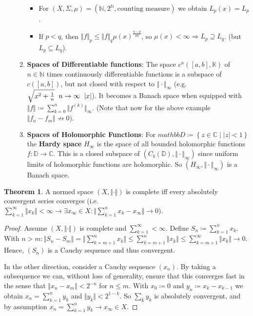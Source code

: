 \documentclass[10pt,a4paper]{article}
\theoremstyle{definition}
\theoremstyle{cor}
\theoremstyle{theorem}
\newtheorem{theorem}{Theorem}
\theoremstyle{lemma}
\theoremstyle{example}
\theoremstyle{remark}
\newcommand{\norm}[1]{\Vert #1 \Vert}
\begin{document}
\begin{itemize}
\begin{enumerate}[(1)]
\begin{itemize}
\item  For $(X, \Sigma, \mu) = \left(\mathbb{N}, 2^{\mathbb{N}}, \text{counting measure} \right)$ we obtain $L_p(x) = L_p$.
\item If $p<q$, then $\norm{f}_p \leq \norm{f}_q \mu(x)^{\frac{q - p}{pq}}$, so $\mu(x) < \infty \Rightarrow L_p \supseteq L_q$. (but $L_p \subseteq L_q$).
\end{itemize}
\item \textbf{Spaces of Differentiable functions}: The space $c^{n}([a , b], \mathbb{K})$ of $n \in \mathbb{N}$ times continuously differentiable functions is a subspace of $c([a, b])$, but not closed with respect to $\norm{\cdot}_{\infty}$ (e.g. $\sqrt{x^2 + \frac{1}{n}} \hspace{2mm}n \to \infty \hspace{2mm} |x|$). It becomes a Banach space when equipped with $\norm{f} \coloneqq \sum_{k = 0}^{n} \norm{f^{(k)}}_{\infty}$. (Note that now for the above example $\norm{f_n - f_m} \not\to 0$).
\item \textbf{Spaces of Holomorphic Functions}: For $mathbb{D} \coloneqq \left\{ z \in \mathbb{C} \mid |z| < 1\right\}$ the \textbf{Hardy space} $H_{\infty}$ is the space of all bounded holomorphic functions $f: \mathbb{D}\to\mathbb{C}$. This is a closed subspace of $(C_b(\mathbb{D}), \norm{\cdot}_{\infty})$ since uniform limits of holomorphic functions are holomorphic. So $(H_{\infty}, \norm{\cdot}_{\infty})$ is a Banach space.
\end{enumerate}
\end{itemize}

\begin{theorem}
A normed space $(X, \norm{\cdot})$ is complete iff every absolutely convergent series converges (i.e. $\sum_{k = 1}^{\infty} \norm{x_k} < \infty \rightarrow \exists x_{\infty} \in X : \norm{\sum_{k=1}^{n} x_k - x_{\infty}} \to 0$).
\end{theorem}
\begin{proof}
Assume $(X, \norm{\cdot})$ is complete and $\sum_{k=1}^{\infty} < \infty$. Define $S_n \coloneqq \sum_{k=1}^{n} x_k$. With $n>m: \norm{S_n -S_m} = \norm{\sum_{k=m+1}^{n} x_k} \leq \sum_{k=m+1}^{n} \norm{x_k} \leq \sum_{k=m+1}^{\infty} \norm{x_k} \to 0$. Hence, $(S_n)$ is a Cauchy sequence and thus convergent. 

In the other direction, consider a Cauchy sequence $(x_n)$. By taking a subsequence we can, without loss of generality, ensure that this converges fast in the sense that $\norm{x_n - x_m} < 2^{-n}$ for $n\leq m$. With $x_0 \coloneqq 0$ and $y_n \coloneqq x_k - x_{k-1}$ we obtain $x_n = \sum_{k=1}^{n} y_k$ and $\norm{y_k} < 2^{1 - k}$. So $\sum_{k} y_{k}$ is absolutely convergent, and by assumption $x_n = \sum_{k = 1}^{n} y_k \to x_{\infty} \in X$.
\end{proof}
\end{document}
